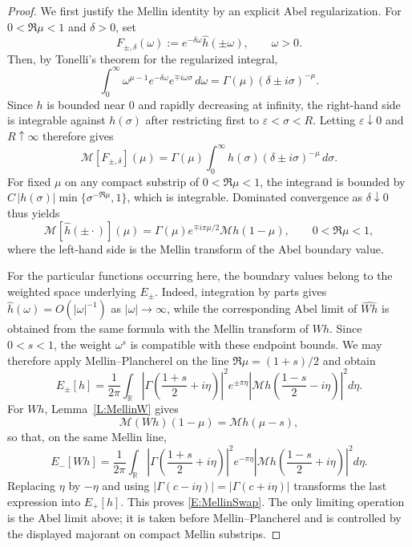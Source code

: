 \documentclass[11pt,letter]{amsart}
\def \R {\mathbb{R}}
\def \G{\Gamma}
\numberwithin{equation}{section}
\numberwithin{equation}{section}
\begin{document}
\begin{proof}
We first justify the Mellin identity by an explicit Abel regularization. For
$0<\Re\mu<1$ and $\delta>0$, set
\[
F_{\pm,\delta}(\omega):=e^{-\delta\omega}\widehat h(\pm\omega),\qquad \omega>0.
\]
Then, by Tonelli's theorem for the regularized integral,
\[
\int_0^\infty\omega^{\mu-1}e^{-\delta\omega}e^{\mp i\omega\sigma}\,d\omega
=\G(\mu)(\delta\pm i\sigma)^{-\mu}.
\]
Since $h$ is bounded near $0$ and rapidly decreasing at infinity, the right-hand
side is integrable against $h(\sigma)$ after restricting first to
$\varepsilon<\sigma<R$. Letting $\varepsilon\downarrow0$ and $R\uparrow\infty$
therefore gives
\[
\mathscr M[F_{\pm,\delta}](\mu)
=\G(\mu)\int_0^\infty h(\sigma)(\delta\pm i\sigma)^{-\mu}
\,d\sigma .
\]
For fixed $\mu$ on any compact substrip of $0<\Re\mu<1$, the integrand is
bounded by $C\,|h(\sigma)|\min\{\sigma^{-\Re\mu},1\}$, which is integrable.
Dominated convergence as $\delta\downarrow0$ thus yields
\begin{equation}\label{E:MellinFourier}
\mathscr M[\widehat h(\pm\cdot)](\mu)
=\G(\mu)e^{\mp i\pi\mu/2}\mathscr Mh(1-\mu),
\qquad 0<\Re\mu<1,
\end{equation}
where the left-hand side is the Mellin transform of the Abel boundary value.

For the particular functions occurring here, the boundary values belong to the
weighted space underlying $E_\pm$. Indeed, integration by parts gives
$\widehat h(\omega)=O(|\omega|^{-1})$ as $|\omega|\to\infty$, while the
corresponding Abel limit of $\widehat{Wh}$ is obtained from the same formula
with the Mellin transform of $Wh$. Since $0<s<1$, the weight $\omega^s$ is
compatible with these endpoint bounds. We may therefore apply Mellin--Plancherel
on the line $\Re\mu=(1+s)/2$ and obtain
\[
E_\pm[h]
=\frac1{2\pi}\int_\R
\left|\G\!\left(\frac{1+s}{2}+i\eta\right)\right|^2
 e^{\pm\pi\eta}
\left|\mathscr Mh\!\left(\frac{1-s}{2}-i\eta\right)\right|^2d\eta.
\]
For $Wh$, Lemma~\ref{L:MellinW} gives
\[
\mathscr M(Wh)(1-\mu)=\mathscr Mh(\mu-s),
\]
so that, on the same Mellin line,
\[
E_-[Wh]
=\frac1{2\pi}\int_\R
\left|\G\!\left(\frac{1+s}{2}+i\eta\right)\right|^2
 e^{-\pi\eta}
\left|\mathscr Mh\!\left(\frac{1-s}{2}+i\eta\right)\right|^2d\eta.
\]
Replacing $\eta$ by $-\eta$ and using
$|\G(c-i\eta)|=|\G(c+i\eta)|$ transforms the last expression into $E_+[h]$.
This proves \eqref{E:MellinSwap}. The only limiting operation is the Abel limit
above; it is taken before Mellin--Plancherel and is controlled by the displayed
majorant on compact Mellin substrips.
\end{proof}
\end{document}
